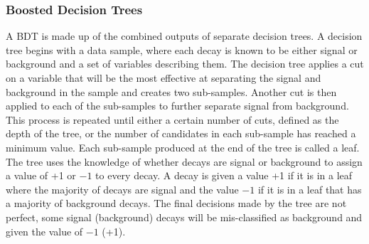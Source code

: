 \subsubsection{Boosted Decision Trees}
\label{sec:GeneralBDT}
A BDT is made up of the combined outputs of separate decision trees. A decision tree begins with a data sample, where each decay is known to be either signal or background and a set of variables describing them. The decision tree applies a cut on a variable that will be the most effective at separating the signal and background in the sample and creates two sub-samples. Another cut is then applied to each of the sub-samples to further separate signal from background. This process is repeated until either a certain number of cuts, defined as the depth of the tree, or the number of candidates in each sub-sample has reached a minimum value. Each sub-sample produced at the end of the tree is called a leaf. The tree uses the knowledge of whether decays are signal or background to assign a value of +1 or $-1$ to every decay. A decay is given a value +1 if it is in a leaf where the majority of decays are signal and the value $-1$ if it is in a leaf that has a majority of background decays. The final decisions made by the tree are not perfect, some signal (background) decays will be mis-classified as background and given the value of $-1$ (+1). %

